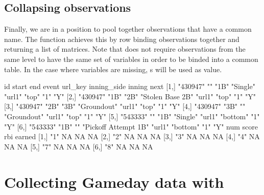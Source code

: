 \begin{article}
\subsection{Collapsing observations}

Finally, we are in a position to pool together observations that have
a common name. The  function achieves this by row
binding observations together and returning a list of matrices.  Note
that  does not require observations from the same
level to have the same set of variables in order to be binded into a
common table. In the case where variables are missing, s will
be used as value.
%
\begin{Schunk}
\begin{Soutput}
     id       start end  event                url_key inning_side inning next
[1,] "430947" ""    "1B" "Single"             "url1"  "top"       "1"    "Y" 
[2,] "430947" "1B"  "2B" "Stolen Base 2B"     "url1"  "top"       "1"    "Y" 
[3,] "430947" "2B"  "3B" "Groundout"          "url1"  "top"       "1"    "Y" 
[4,] "430947" "3B"  ""   "Groundout"          "url1"  "top"       "1"    "Y" 
[5,] "543333" ""    "1B" "Single"             "url1"  "bottom"    "1"    "Y" 
[6,] "543333" "1B"  ""   "Pickoff Attempt 1B" "url1"  "bottom"    "1"    "Y" 
     num score rbi earned
[1,] "1" NA    NA  NA    
[2,] "2" NA    NA  NA    
[3,] "3" NA    NA  NA    
[4,] "4" NA    NA  NA    
[5,] "7" NA    NA  NA    
[6,] "8" NA    NA  NA    
\end{Soutput}
\end{Schunk}

\section[Collecting Gameday data with pitchRx]{Collecting Gameday data with }


\end{article}

